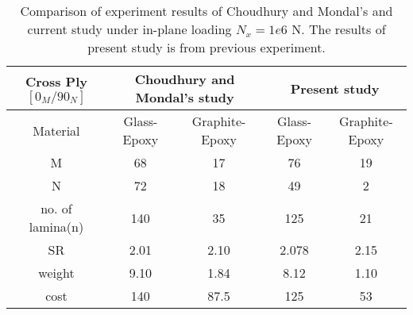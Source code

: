 \begin{table*}[!tb]
\caption{Comparison of experiment results of Choudhury and
Mondal's\cite{choudhury2019failure} and current study under in-plane loading
$N_x=1e6$ N. The results of present study is from previous experiment.}
\centering
\begin{adjustbox}{width=1\textwidth}
	\begin{tabular}{c|cc|cc}
		\toprule
		Cross Ply $[0_M/90_N]$         & \multicolumn{2}{c}{Choudhury and Mondal's study} & \multicolumn{2}{c}{Present study} \\
		\midrule																								  
		 Material       &  Glass-Epoxy & Graphite-Epoxy  & Glass-Epoxy & Graphite-Epoxy      \\ 
			  M         &  68          &    17           &  76		    &  19             \\
			  N         &  72          &    18           &  49		    &  2              \\
	no. of lamina(n)    &  140         &    35           &  125	        &  21                     \\
			 SR         &  2.01        &    2.10         &  2.078	    &  2.15            \\
		 weight         &  9.10        &    1.84         &  8.12	    &  1.10           \\
		 cost           &  140         &    87.5         &  125	        &  53           \\
		\bottomrule
	\end{tabular}
\end{adjustbox}
\label{tab:comparsion}
\end{table*}
